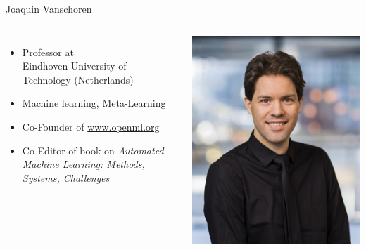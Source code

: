 \begin{frame}[c]{Joaquin Vanschoren}



\begin{columns}
	
	
	\begin{itemize}
		\item Professor at\\ Eindhoven University of Technology (Netherlands)
		\item Machine learning, Meta-Learning
		\item Co-Founder of \url{www.openml.org}
    	\item Co-Editor of book on \textit{Automated Machine Learning:	Methods, Systems, Challenges}
	\end{itemize}
	
	
	\includegraphics[width=1.0\textwidth]{images/vanschoren.jpg}
	
\end{columns}


\end{frame}
